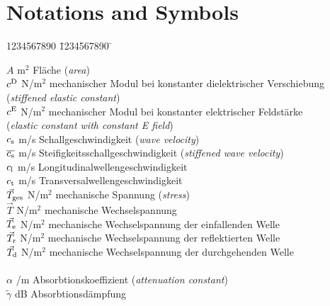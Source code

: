 \section*{Notations and Symbols}


\begin{tabbing}
1234567890 \= 1234567890 \= \kill

$A$             \> m$^2$    \> Fläche ({\it area})\\
$c^{\rm D}$ \> N/m$^2$  \> mechanischer Modul bei konstanter dielektrischer
                             Verschiebung\\
            \>            \> ({\it stiffened elastic constant})\\
$c^{\rm E}$ \> N/m$^2$  \> mechanischer Modul bei konstanter elektrischer
                                                         Feldstärke\\
            \>            \> ({\it elastic constant with constant E field})\\
$c_{\rm s}$ \> m/s      \> Schallgeschwindigkeit ({\it wave velocity})\\
$\overline {c_{\rm s}}$
           \> m/s       \> Steifigkeitsschallgeschwindigkeit
                                                ({\it stiffened wave velocity})\\
$c_{\rm l}$ \> m/s      \> Longitudinalwellengeschwindigkeit\\
$c_{\rm t}$ \> m/s      \> Transversalwellengeschwindigkeit\\
$\vec T_{\rm ges}$
            \> N/m$^2$  \> mechanische Spannung ({\it stress})\\
$\vec T$    \> N/m$^2$  \> mechanische Wechselspannung\\
$\vec T_{\rm e}$ \> N/m$^2$  \> mechanische Wechselspannung der
                                                                  einfallenden Welle\\
$\vec T_{\rm r}$ \> N/m$^2$  \> mechanische Wechselspannung der
                                                                  reflektierten Welle\\
$\vec T_{\rm d}$ \> N/m$^2$  \> mechanische Wechselspannung der
                                                                  durchgehenden Welle\\
\\
$\alpha$        /m      \> Absorbtionskoeffizient ({\it attenuation constant})\\
$\tilde\gamma$  \> dB       \> Absorbtionsdämpfung\\

\end{tabbing}
